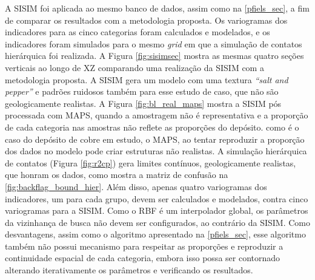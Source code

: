 A SISIM foi aplicada ao mesmo banco de dados, assim como na \autoref{pfiels_sec}, a fim de comparar os resultados com a metodologia proposta. Os variogramas dos indicadores para as cinco categorias foram calculados e modelados, e os indicadores foram simulados para o mesmo \textit{grid} em que a simulação de contatos hierárquica foi realizada. A Figura \autoref{fig:sisimsec} mostra as mesmas quatro seções verticais ao longo de XZ comparando uma realização da SISIM com a metodologia proposta. A SISIM gera um modelo com uma textura \textit{“salt and pepper”} e padrões ruidosos também para esse estudo de caso, que não são geologicamente realistas. A Figura \autoref{fig:bl_real_maps} mostra a SISIM pós processada com MAPS, quando a amostragem não é representativa e a proporção de cada categoria nas amostras não reflete as proporções do depósito. como é o caso do depósito de cobre em estudo, o MAPS, ao tentar reproduzir a proporção dos dados no modelo pode criar estruturas não realistas. A simulação hierárquica de contatos (Figura \autoref{fig:r2cp}) gera limites contínuos, geologicamente realistas, que honram os dados, como mostra a matriz de confusão na \autoref{fig:backflag_bound_hier}. Além disso, apenas quatro variogramas dos indicadores, um para cada grupo, devem ser calculados e modelados, contra cinco variogramas para a SISIM. Como o RBF é um interpolador global, os parâmetros da vizinhança de busca não devem ser configurados, ao contrário da SISIM. Como desvantagens, assim como o algoritmo apresentado na \autoref{pfiels_sec}, esse algoritmo também não possui mecanismo para respeitar as proporções e reproduzir a continuidade espacial de cada categoria, embora isso possa ser contornado alterando iterativamente os parâmetros e verificando os resultados.

